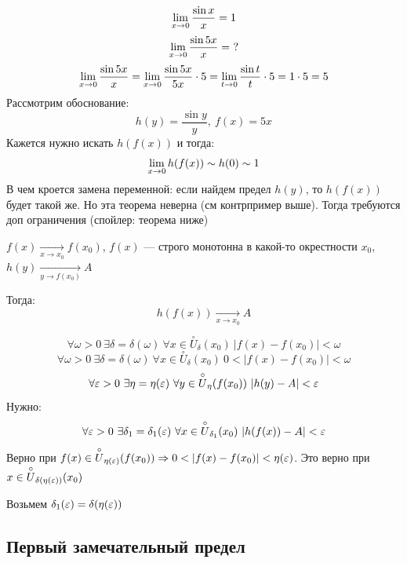 \begin{example}
    \[
        \lim\limits_{x \to 0} \frac{\sin x}{x} = 1
    \]
    \[
        \lim\limits_{x \to 0} \frac{\sin 5x}{x} =\ ?
    \]
    \[
        \lim\limits_{x \to 0} \frac{\sin 5x}{x} = \lim\limits_{x \to 0} \frac{\sin 5x}{5x} \cdot 5 = \lim\limits_{t \to 0} \frac{\sin t}{t} \cdot 5 = 1 \cdot 5 = 5
    \]
    Рассмотрим обоснование: 
    \[
        h(y) = \frac{\sin y}{y},\ f(x) = 5x
    \]
    Кажется нужно искать $h(f(x))$ и тогда: 
    \[
        \lim\limits_{x \to 0} h(f(x)) \sim h(0) \sim 1
    \]
    В чем кроется замена переменной: если найдем предел $h(y)$, то $h(f(x))$ будет такой же. Но эта теорема неверна (см контрпример выше). Тогда требуются доп ограничения (спойлер: теорема ниже)
\end{example}

\begin{theorem}
    $f(x) \xrightarrow[x \to x_0]{} f(x_0)$, $f(x)$ --- строго монотонна в какой-то окрестности $x_0$, $h(y) \xrightarrow[y \to f(x_0)]{} A$

    Тогда:
    \[
        h(f(x)) \xrightarrow[x \to x_0]{} A
    \]
\end{theorem}

\begin{Proof}
    \[
        \forall \omega > 0\ \exists \delta = \delta (\omega )\ \forall x \in \overset{\circ}{U}_{\delta }(x_0)\ |f(x) - f(x_0)| < \omega
    \]
    \[
        \forall \omega > 0\ \exists \delta = \delta (\omega )\ \forall x \in \overset{\circ}{U}_{\delta }(x_0)\ 0 < |f(x) - f(x_0)| < \omega
    \]
    \[
        \forall \varepsilon > 0\ \exists \eta = \eta (\varepsilon )\ \forall y \in \overset{\circ}{U}_{\eta }(f(x_0))\ |h(y) - A| < \varepsilon 
    \]
    Нужно: 
    \[
        \forall \varepsilon > 0\ \exists \delta_1 = \delta_1 (\varepsilon )\ \forall x \in \overset{\circ}{U}_{\delta_1 }(x_0)\ |h(f(x)) - A| < \varepsilon 
    \]
    Верно при $f(x) \in \overset{\circ}{U}_{\eta(\varepsilon ) }(f(x_0)) \Rightarrow 0 < |f(x) - f(x_0)| < \eta(\varepsilon )$. Это верно при $x \in \overset{\circ}{U}_{\delta(\eta (\varepsilon )) }(x_0) $

    Возьмем $\delta_1(\varepsilon ) = \delta (\eta (\varepsilon ))$
\end{Proof}

\subsection{Первый замечательный предел}

